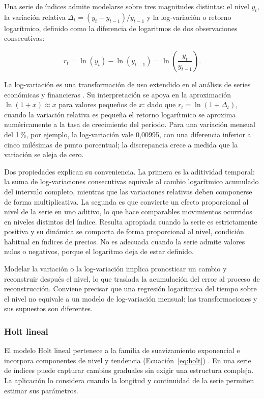 \documentclass[12pt,letterpaper]{article}
\providecommand{\parencite}{\citep}
\begin{document}
Una serie de índices admite modelarse sobre tres magnitudes distintas: el nivel \(y_t\), la variación relativa \(\Delta_t=(y_t-y_{t-1})/y_{t-1}\) y la log-variación o retorno logarítmico, definido como la diferencia de logaritmos de dos observaciones consecutivas:

\begin{equation}
r_t=\ln(y_t)-\ln(y_{t-1})=\ln\!\left(\frac{y_t}{y_{t-1}}\right).
\label{eq:logvariacion}
\end{equation}

La log-variación es una transformación de uso extendido en el análisis de series económicas y financieras \parencite{tsay2010analysis}. Su interpretación se apoya en la aproximación \(\ln(1+x)\approx x\) para valores pequeños de \(x\): dado que \(r_t=\ln(1+\Delta_t)\), cuando la variación relativa es pequeña el retorno logarítmico se aproxima numéricamente a la tasa de crecimiento del periodo. Para una variación mensual del 1\,\%, por ejemplo, la log-variación vale 0,00995, con una diferencia inferior a cinco milésimas de punto porcentual; la discrepancia crece a medida que la variación se aleja de cero.

Dos propiedades explican su conveniencia. La primera es la aditividad temporal: la suma de log-variaciones consecutivas equivale al cambio logarítmico acumulado del intervalo completo, mientras que las variaciones relativas deben componerse de forma multiplicativa. La segunda es que convierte un efecto proporcional al nivel de la serie en uno aditivo, lo que hace comparables movimientos ocurridos en niveles distintos del índice. Resulta apropiada cuando la serie es estrictamente positiva y su dinámica se comporta de forma proporcional al nivel, condición habitual en índices de precios. No es adecuada cuando la serie admite valores nulos o negativos, porque el logaritmo deja de estar definido.

Modelar la variación o la log-variación implica pronosticar un cambio y reconstruir después el nivel, lo que traslada la acumulación del error al proceso de reconstrucción. Conviene precisar que una regresión logarítmica del tiempo sobre el nivel no equivale a un modelo de log-variación mensual: las transformaciones y sus supuestos son diferentes.

\subsubsection{Holt lineal}

El modelo Holt lineal pertenece a la familia de suavizamiento exponencial e incorpora componentes de nivel y tendencia (Ecuación~\ref{eq:holt}) \parencite{holt1957}. En una serie de índices puede capturar cambios graduales sin exigir una estructura compleja. La aplicación lo considera cuando la longitud y continuidad de la serie permiten estimar sus parámetros.
\end{document}
